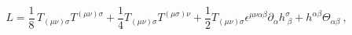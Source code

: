 \begin{equation}
L=\frac{1}{8}\,T_{(\mu \nu )\sigma }T^{(\mu \nu )\sigma }+\frac{1}{4}T_{(\mu
\nu )\sigma }T^{(\mu \sigma )\nu }+\frac{1}{2}T_{(\mu \nu )\sigma }\epsilon
^{\mu \nu \alpha \beta }\partial _{\alpha }h_{\;\beta }^{\sigma }+h^{\alpha
\beta }\Theta _{\alpha \beta }\ ,  \label{plag}
\end{equation}%
